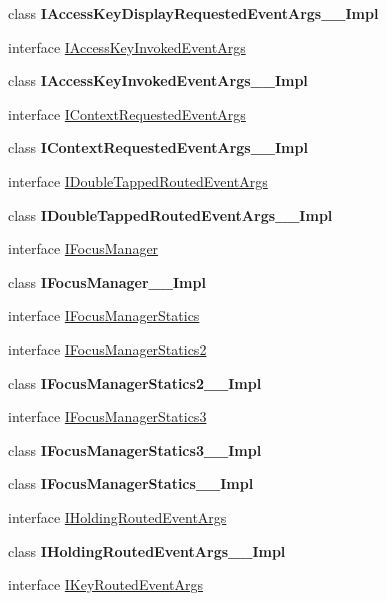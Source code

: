 \begin{DoxyCompactItemize}
\item 
class {\bfseries I\+Access\+Key\+Display\+Requested\+Event\+Args\+\_\+\+\_\+\+Impl}
\item 
interface \hyperlink{interface_windows_1_1_u_i_1_1_xaml_1_1_input_1_1_i_access_key_invoked_event_args}{I\+Access\+Key\+Invoked\+Event\+Args}
\item 
class {\bfseries I\+Access\+Key\+Invoked\+Event\+Args\+\_\+\+\_\+\+Impl}
\item 
interface \hyperlink{interface_windows_1_1_u_i_1_1_xaml_1_1_input_1_1_i_context_requested_event_args}{I\+Context\+Requested\+Event\+Args}
\item 
class {\bfseries I\+Context\+Requested\+Event\+Args\+\_\+\+\_\+\+Impl}
\item 
interface \hyperlink{interface_windows_1_1_u_i_1_1_xaml_1_1_input_1_1_i_double_tapped_routed_event_args}{I\+Double\+Tapped\+Routed\+Event\+Args}
\item 
class {\bfseries I\+Double\+Tapped\+Routed\+Event\+Args\+\_\+\+\_\+\+Impl}
\item 
interface \hyperlink{interface_windows_1_1_u_i_1_1_xaml_1_1_input_1_1_i_focus_manager}{I\+Focus\+Manager}
\item 
class {\bfseries I\+Focus\+Manager\+\_\+\+\_\+\+Impl}
\item 
interface \hyperlink{interface_windows_1_1_u_i_1_1_xaml_1_1_input_1_1_i_focus_manager_statics}{I\+Focus\+Manager\+Statics}
\item 
interface \hyperlink{interface_windows_1_1_u_i_1_1_xaml_1_1_input_1_1_i_focus_manager_statics2}{I\+Focus\+Manager\+Statics2}
\item 
class {\bfseries I\+Focus\+Manager\+Statics2\+\_\+\+\_\+\+Impl}
\item 
interface \hyperlink{interface_windows_1_1_u_i_1_1_xaml_1_1_input_1_1_i_focus_manager_statics3}{I\+Focus\+Manager\+Statics3}
\item 
class {\bfseries I\+Focus\+Manager\+Statics3\+\_\+\+\_\+\+Impl}
\item 
class {\bfseries I\+Focus\+Manager\+Statics\+\_\+\+\_\+\+Impl}
\item 
interface \hyperlink{interface_windows_1_1_u_i_1_1_xaml_1_1_input_1_1_i_holding_routed_event_args}{I\+Holding\+Routed\+Event\+Args}
\item 
class {\bfseries I\+Holding\+Routed\+Event\+Args\+\_\+\+\_\+\+Impl}
\item 
interface \hyperlink{interface_windows_1_1_u_i_1_1_xaml_1_1_input_1_1_i_key_routed_event_args}{I\+Key\+Routed\+Event\+Args}

\end{DoxyCompactItemize}
